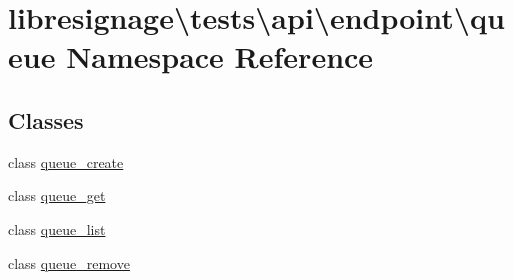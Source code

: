 \hypertarget{namespacelibresignage_1_1tests_1_1api_1_1endpoint_1_1queue}{}\section{libresignage\textbackslash{}tests\textbackslash{}api\textbackslash{}endpoint\textbackslash{}queue Namespace Reference}
\label{namespacelibresignage_1_1tests_1_1api_1_1endpoint_1_1queue}
\subsection*{Classes}
\begin{DoxyCompactItemize}
\item 
class \hyperlink{classlibresignage_1_1tests_1_1api_1_1endpoint_1_1queue_1_1queue__create}{queue\+\_\+create}
\item 
class \hyperlink{classlibresignage_1_1tests_1_1api_1_1endpoint_1_1queue_1_1queue__get}{queue\+\_\+get}
\item 
class \hyperlink{classlibresignage_1_1tests_1_1api_1_1endpoint_1_1queue_1_1queue__list}{queue\+\_\+list}
\item 
class \hyperlink{classlibresignage_1_1tests_1_1api_1_1endpoint_1_1queue_1_1queue__remove}{queue\+\_\+remove}
\end{DoxyCompactItemize}
